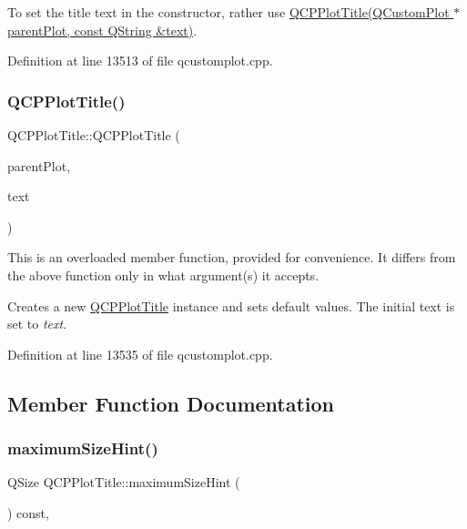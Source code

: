 To set the title text in the constructor, rather use \hyperlink{class_q_c_p_plot_title_a90b9f46ceccbeee41f71c895a8c7ee1f}{Q\+C\+P\+Plot\+Title(\+Q\+Custom\+Plot $\ast$parent\+Plot, const Q\+String \&text)}. 

Definition at line 13513 of file qcustomplot.\+cpp.

\mbox{\label{class_q_c_p_plot_title_a90b9f46ceccbeee41f71c895a8c7ee1f}} 
\subsubsection{\texorpdfstring{Q\+C\+P\+Plot\+Title()}{QCPPlotTitle()}\hspace{0.1cm}{\footnotesize\ttfamily [2/2]}}
{\footnotesize\ttfamily Q\+C\+P\+Plot\+Title\+::\+Q\+C\+P\+Plot\+Title (\begin{DoxyParamCaption}\item[{\hyperlink{class_q_custom_plot}{Q\+Custom\+Plot} $\ast$}]{parent\+Plot,  }\item[{const Q\+String \&}]{text }\end{DoxyParamCaption})\hspace{0.3cm}{\ttfamily [explicit]}}

This is an overloaded member function, provided for convenience. It differs from the above function only in what argument(s) it accepts.

Creates a new \hyperlink{class_q_c_p_plot_title}{Q\+C\+P\+Plot\+Title} instance and sets default values. The initial text is set to {\itshape text}. 

Definition at line 13535 of file qcustomplot.\+cpp.



\subsection{Member Function Documentation}
\mbox{\label{class_q_c_p_plot_title_ae24c395b5d3be64b42dcb9e27ed023c4}} 
\subsubsection{\texorpdfstring{maximum\+Size\+Hint()}{maximumSizeHint()}}
{\footnotesize\ttfamily Q\+Size Q\+C\+P\+Plot\+Title\+::maximum\+Size\+Hint (\begin{DoxyParamCaption}{ }\end{DoxyParamCaption}) const\hspace{0.3cm}{\ttfamily [protected]}, {\ttfamily [virtual]}}


